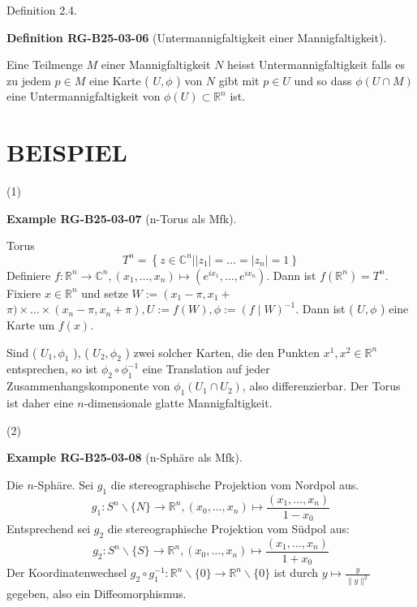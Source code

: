 \documentclass[10pt, letterpaper]{article}
\newcommand{\CustomHeading}[3]{%
  \par\medskip\noindent%
  \textbf{#1 #2} \textnormal{(#3)}.\enskip%
}
\newenvironment{DEF}[2]{\begin{unitbox}\CustomHeading{Definition}{#1}{#2}}{\end{unitbox}}
\newenvironment{EXA}[2]{\begin{unitbox}\CustomHeading{Example}{#1}{#2}}{\end{unitbox}}
\begin{document}
Definition 2.4. 


\begin{DEF}{RG-B25-03-06}{Untermannigfaltigkeit einer Mannigfaltigkeit}
Eine Teilmenge $M$ einer Mannigfaltigkeit $N$ heisst Untermannigfaltigkeit falls es zu jedem $p \in M$ eine Karte ( $U, \phi$ ) von $N$ gibt mit $p \in U$ und so dass $\phi(U \cap M)$ eine Untermannigfaltigkeit von $\phi(U) \subset \mathbb{R}^{n}$ ist.
\end{DEF}



\section*{BEISPIEL}
(1) 


\begin{EXA}{RG-B25-03-07}{n-Torus als Mfk}
Torus
$$
T^{n}=\left\{z \in \mathbb{C}^{n}| | z_{1}\left|=\ldots=\left|z_{n}\right|=1\right\}\right.
$$
Definiere $f: \mathbb{R}^{n} \rightarrow \mathbb{C}^{n},\left(x_{1}, \ldots, x_{n}\right) \mapsto\left(e^{i x_{1}}, \ldots, e^{i x_{n}}\right)$. Dann ist $f\left(\mathbb{R}^{n}\right)=T^{n}$. Fixiere $x \in \mathbb{R}^{n}$ und setze $W:=\left(x_{1}-\pi, x_{1}+\right.$ $\pi) \times \ldots \times\left(x_{n}-\pi, x_{n}+\pi\right), U:=f(W), \phi:=(f \mid W)^{-1}$. Dann ist ( $U, \phi$ ) eine Karte um $f(x)$.

Sind ( $U_{1}, \phi_{1}$ ), ( $U_{2}, \phi_{2}$ ) zwei solcher Karten, die den Punkten $x^{1}, x^{2} \in \mathbb{R}^{n}$ entsprechen, so ist $\phi_{2} \circ \phi_{1}^{-1}$ eine Translation auf jeder Zusammenhangskomponente von $\phi_{1}\left(U_{1} \cap U_{2}\right)$, also differenzierbar. Der Torus ist daher eine $n$-dimensionale glatte Mannigfaltigkeit.
\end{EXA}


(2) 

\begin{EXA}{RG-B25-03-08}{n-Sphäre als Mfk}
Die $n$-Sphäre. Sei $g_{1}$ die stereographische Projektion vom Nordpol aus.
$$
g_{1}: S^{n} \backslash\{N\} \rightarrow \mathbb{R}^{n},\left(x_{0}, \ldots, x_{n}\right) \mapsto \frac{\left(x_{1}, \ldots, x_{n}\right)}{1-x_{0}}
$$
Entsprechend sei $g_{2}$ die stereographische Projektion vom Südpol aus:
$$
g_{2}: S^{n} \backslash\{S\} \rightarrow \mathbb{R}^{n},\left(x_{0}, \ldots, x_{n}\right) \mapsto \frac{\left(x_{1}, \ldots, x_{n}\right)}{1+x_{0}}
$$
Der Koordinatenwechsel $g_{2} \circ g_{1}^{-1}: \mathbb{R}^{n} \backslash\{0\} \rightarrow \mathbb{R}^{n} \backslash\{0\}$ ist durch $y \mapsto \frac{y}{\|y\|^{2}}$ gegeben, also ein Diffeomorphismus.
\end{EXA}
\end{document}

